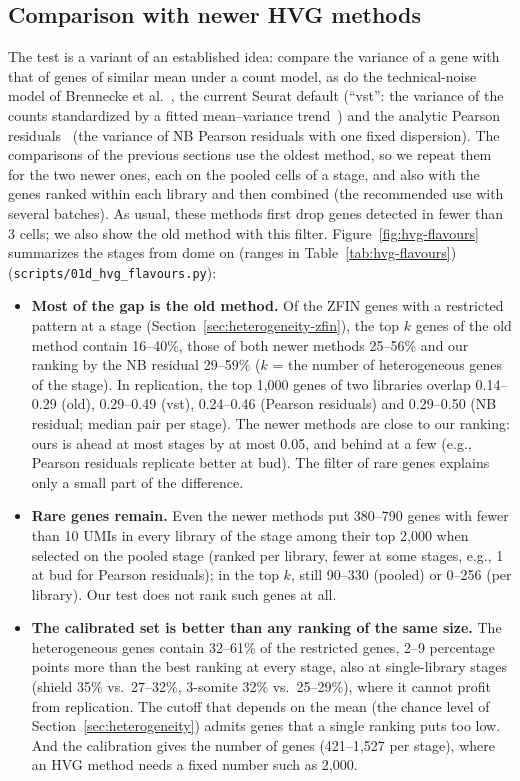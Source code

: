 \documentclass[11pt,a4paper]{article}
\begin{document}
\subsection{Comparison with newer HVG methods}
\label{sec:hvg-flavours}

The test is a variant of an established idea: compare the variance of a gene with that of genes of similar mean under a count model, as do the technical-noise model of Brennecke et al.~\cite{brennecke2013noise}, the current Seurat default (``vst'': the variance of the counts standardized by a fitted mean--variance trend~\cite{stuart2019seurat}) and the analytic Pearson residuals~\cite{lause2021pearson} (the variance of NB Pearson residuals with one fixed dispersion). The comparisons of the previous sections use the oldest method, so we repeat them for the two newer ones, each on the pooled cells of a stage, and also with the genes ranked within each library and then combined (the recommended use with several batches). As usual, these methods first drop genes detected in fewer than 3 cells; we also show the old method with this filter. Figure~\ref{fig:hvg-flavours} summarizes the stages from dome on (ranges in Table~\ref{tab:hvg-flavours}) (\nolinkurl{scripts/01d_hvg_flavours.py}):
\begin{itemize}
	\item \textbf{Most of the gap is the old method.} Of the ZFIN genes with a restricted pattern at a stage (Section~\ref{sec:heterogeneity-zfin}), the top $k$ genes of the old method contain 16--40\%, those of both newer methods 25--56\% and our ranking by the NB residual 29--59\% ($k$ = the number of heterogeneous genes of the stage). In replication, the top 1{,}000 genes of two libraries overlap 0.14--0.29 (old), 0.29--0.49 (vst), 0.24--0.46 (Pearson residuals) and 0.29--0.50 (NB residual; median pair per stage). The newer methods are close to our ranking: ours is ahead at most stages by at most 0.05, and behind at a few (e.g., Pearson residuals replicate better at bud). The filter of rare genes explains only a small part of the difference.
	\item \textbf{Rare genes remain.} Even the newer methods put 380--790 genes with fewer than 10 UMIs in every library of the stage among their top 2{,}000 when selected on the pooled stage (ranked per library, fewer at some stages, e.g., 1 at bud for Pearson residuals); in the top $k$, still 90--330 (pooled) or 0--256 (per library). Our test does not rank such genes at all.
	\item \textbf{The calibrated set is better than any ranking of the same size.} The heterogeneous genes contain 32--61\% of the restricted genes, 2--9 percentage points more than the best ranking at every stage, also at single-library stages (shield 35\% vs.\ 27--32\%, 3-somite 32\% vs.\ 25--29\%), where it cannot profit from replication. The cutoff that depends on the mean (the chance level of Section~\ref{sec:heterogeneity}) admits genes that a single ranking puts too low. And the calibration gives the number of genes (421--1{,}527 per stage), where an HVG method needs a fixed number such as 2{,}000.
\end{itemize}
\end{document}
